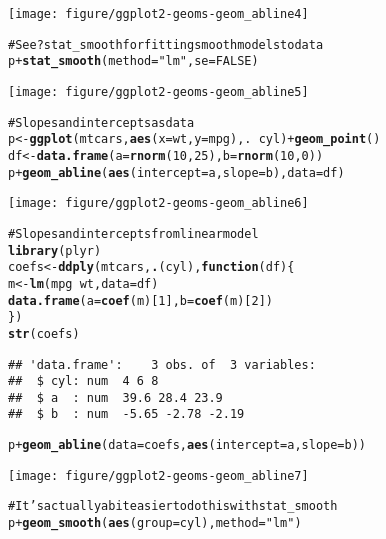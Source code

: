 \documentclass[a4paper,titlepage]{tufte-handout}\usepackage{graphicx, color}
\makeatletter
\def\maxwidth{ %
  \ifdim\Gin@nat@width>\linewidth
    \linewidth
  \else
    \Gin@nat@width
  \fi
}
\newcommand{\hlfunctioncall}[1]{\textcolor[rgb]{0.501960784313725,0,0.329411764705882}{\textbf{#1}}}%
\newcommand{\hlstring}[1]{\textcolor[rgb]{0.6,0.6,1}{#1}}%
\newcommand{\hlcomment}[1]{\textcolor[rgb]{0.180392156862745,0.6,0.341176470588235}{#1}}%
\newenvironment{kframe}{%
 \def\at@end@of@kframe{}%
 \ifinner\ifhmode%
  \def\at@end@of@kframe{\end{minipage}}%
  \begin{minipage}{\columnwidth}%
 \fi\fi%
 \def\FrameCommand##1{\hskip\@totalleftmargin \hskip-\fboxsep
 \colorbox{shadecolor}{##1}\hskip-\fboxsep
     \hskip-\linewidth \hskip-\@totalleftmargin \hskip\columnwidth}%
 \MakeFramed {\advance\hsize-\width
   \@totalleftmargin\z@ \linewidth\hsize
   \@setminipage}}%
 {\par\unskip\endMakeFramed%
 \at@end@of@kframe}
\newenvironment{knitrout}{}{} %
\makeatother
\begin{document}
\begin{knitrout}
\begin{kframe}
\begin{alltt}
\end{alltt}
\end{kframe}\texttt{[image: figure/ggplot2-geoms-geom\_abline4]} \begin{kframe}\begin{alltt}
\hlcomment{# See ?stat_smooth for fitting smooth models to data}
p + \hlfunctioncall{stat_smooth}(method=\hlstring{"lm"}, se=FALSE)
\end{alltt}
\end{kframe}\texttt{[image: figure/ggplot2-geoms-geom\_abline5]} \begin{kframe}\begin{alltt}
\hlcomment{# Slopes and intercepts as data}
p <- \hlfunctioncall{ggplot}(mtcars, \hlfunctioncall{aes}(x = wt, y=mpg), . ~ cyl) + \hlfunctioncall{geom_point}()
df <- \hlfunctioncall{data.frame}(a=\hlfunctioncall{rnorm}(10, 25), b=\hlfunctioncall{rnorm}(10, 0))
p + \hlfunctioncall{geom_abline}(\hlfunctioncall{aes}(intercept=a, slope=b), data=df)
\end{alltt}
\end{kframe}\texttt{[image: figure/ggplot2-geoms-geom\_abline6]} \begin{kframe}\begin{alltt}
\hlcomment{# Slopes and intercepts from linear model}
\hlfunctioncall{library}(plyr)
coefs <- \hlfunctioncall{ddply}(mtcars, \hlfunctioncall{.}(cyl), \hlfunctioncall{function}(df) \{
  m <- \hlfunctioncall{lm}(mpg ~ wt, data=df)
  \hlfunctioncall{data.frame}(a = \hlfunctioncall{coef}(m)[1], b = \hlfunctioncall{coef}(m)[2])
\})
\hlfunctioncall{str}(coefs)
\end{alltt}
\begin{verbatim}
## 'data.frame':	3 obs. of  3 variables:
##  $ cyl: num  4 6 8
##  $ a  : num  39.6 28.4 23.9
##  $ b  : num  -5.65 -2.78 -2.19
\end{verbatim}
\begin{alltt}
p + \hlfunctioncall{geom_abline}(data=coefs, \hlfunctioncall{aes}(intercept=a, slope=b))
\end{alltt}
\end{kframe}\texttt{[image: figure/ggplot2-geoms-geom\_abline7]} \begin{kframe}\begin{alltt}
\hlcomment{# It's actually a bit easier to do this with stat_smooth}
p + \hlfunctioncall{geom_smooth}(\hlfunctioncall{aes}(group=cyl), method=\hlstring{"lm"})
\end{alltt}

\end{kframe}
\end{knitrout}
\end{document}

